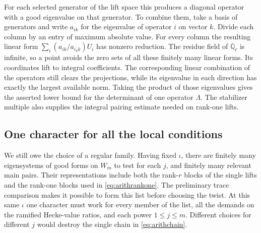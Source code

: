 For each selected generator of the lift space this produces a diagonal operator with a good eigenvalue on that generator. To combine them, take a basis of generators and write $a_{ik}$ for the eigenvalue of operator $i$ on vector $k$. Divide each column by an entry of maximum absolute value. For every column the resulting linear form $\sum_i (a_{ik}/a_{i_k k})U_i$ has nonzero reduction. The residue field of $\overline{\mathbb Q}_\ell$ is infinite, so a point avoids the zero sets of all these finitely many linear forms. Its coordinates lift to integral coefficients. The corresponding linear combination of the operators still clears the projections, while its eigenvalue in each direction has exactly the largest available norm. Taking the product of those eigenvalues gives the asserted lower bound for the determinant of one operator $\Lambda$. The stabilizer multiple also supplies the integral pairing estimate needed on rank-one lifts.

\subsection{One character for all the local conditions}
We still owe the choice of a regular family. Having fixed $\iota$, there are finitely many eigensystems of good forms on $W_m$ to test for each $j$, and finitely many relevant main pairs. Their representations include both the rank-$r$ blocks of the single lifts and the rank-one blocks used in \eqref{eq:arithrankone}. The preliminary trace comparison makes it possible to form this list before choosing the twist. At this same $\iota$ one character must work for every member of the list, all the demands on the ramified Hecke-value ratios, and each power $1\le j\le m$. Different choices for different $j$ would destroy the single chain in \eqref{eq:arithchain}.

